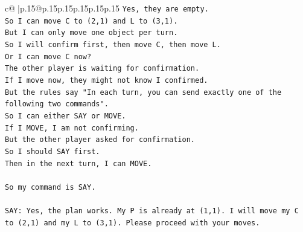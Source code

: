 \documentclass{article}
\begin{document}
{\begin{supertabular}{c@{$\;$}|p{.15\linewidth}@{}p{.15\linewidth}p{.15\linewidth}p{.15\linewidth}p{.15\linewidth}p{.15\linewidth}}
{{{\texttt{Yes, they are empty.} \\
\texttt{So I can move C to (2,1) and L to (3,1).} \\
\texttt{But I can only move one object per turn.} \\
\texttt{So I will confirm first, then move C, then move L.} \\
\texttt{Or I can move C now?} \\
\texttt{The other player is waiting for confirmation.} \\
\texttt{If I move now, they might not know I confirmed.} \\
\texttt{But the rules say "In each turn, you can send exactly one of the following two commands".} \\
\texttt{So I can either SAY or MOVE.} \\
\texttt{If I MOVE, I am not confirming.} \\
\texttt{But the other player asked for confirmation.} \\
\texttt{So I should SAY first.} \\
\texttt{Then in the next turn, I can MOVE.} \\
\\ 
\texttt{So my command is SAY.} \\
\\ 
\texttt{SAY: Yes, the plan works. My P is already at (1,1). I will move my C to (2,1) and my L to (3,1). Please proceed with your moves.} \\
            }
        }
    }
     \\ \\


\end{supertabular}}
\end{document}
